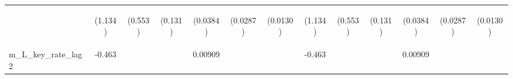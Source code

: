 \documentclass[]{article}
\begin{document}
\begin{center}
\begin{tabular}{lcccccccccccc}
\vspace{4pt} & \begin{footnotesize}(1.134)\end{footnotesize} & \begin{footnotesize}(0.553)\end{footnotesize} & \begin{footnotesize}(0.131)\end{footnotesize} & \begin{footnotesize}(0.0384)\end{footnotesize} & \begin{footnotesize}(0.0287)\end{footnotesize} & \begin{footnotesize}(0.0130)\end{footnotesize} & \begin{footnotesize}(1.134)\end{footnotesize} & \begin{footnotesize}(0.553)\end{footnotesize} & \begin{footnotesize}(0.131)\end{footnotesize} & \begin{footnotesize}(0.0384)\end{footnotesize} & \begin{footnotesize}(0.0287)\end{footnotesize} & \begin{footnotesize}(0.0130)\end{footnotesize} \\
m\_L\_key\_rate\_lag2 & -0.463 &  &  & 0.00909 &  &  & -0.463 &  &  & 0.00909 &  &  \\

\end{tabular}
\end{center}
\end{document}

